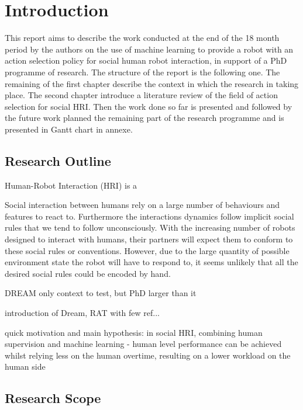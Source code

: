 \chapter{Introduction}

This report aims to describe the work conducted at the end of the 18 month period by the authors on the use of machine learning to provide a robot with an action selection policy for social human robot interaction, in support of a PhD programme of research. The structure of the report is the following one. The remaining of the first chapter describe the context in which the research in taking place. The second chapter introduce a literature review of the field of action selection for social HRI. Then the work done so far is presented and followed by the future work planned the remaining part of the research programme and is presented in Gantt chart in annexe.

\section{Research Outline} %

Human-Robot Interaction (HRI) is a

Social interaction between humans rely on a large number of behaviours and features to react to. Furthermore the interactions dynamics follow implicit social rules that we tend to follow unconsciously. With the increasing number of robots designed to interact with humans, their partners will expect them to conform to these social rules or conventions. However, due to the large quantity of possible environment state the robot will have to respond to, it seems unlikely that all the desired social rules could be encoded by hand. 

DREAM only context to test, but PhD larger than it

introduction of Dream, RAT with few ref...

quick motivation and main hypothesis:
in social HRI, combining human supervision and machine learning - human level performance can be achieved whilst relying less on the human overtime, resulting on a lower workload on the human side

\section{Research Scope}

